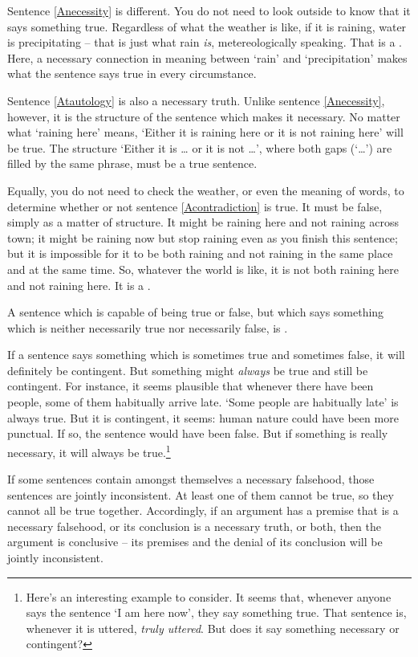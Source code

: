 Sentence \ref{Anecessity} is different. You do not need to look outside to know that it says something true. Regardless of what the weather is like, if it is raining, water is precipitating – that is just what rain \emph{is}, metereologically speaking. That is a . Here, a necessary connection in meaning between `rain' and `precipitation' makes what the sentence says true in every circumstance.

Sentence \ref{Atautology} is also a necessary truth. Unlike sentence \ref{Anecessity}, however, it is the structure of the sentence which makes it necessary. No matter what `raining here' means, `Either it is raining here or it is not raining here' will be true. The structure `\textsf{Either it is} … \textsf{or it is not} …', where both gaps (`…') are filled by the same phrase, must be a true sentence.

Equally, you do not need to check the weather, or even the meaning of words, to determine whether or not sentence \ref{Acontradiction} is true. It must be false, simply as a matter of structure. It might be raining here and not raining across town; it might be raining now but stop raining even as you finish this sentence; but it is impossible for it to be both raining and not raining in the same place and at the same time. So, whatever the world is like, it is not both raining here and not raining here. It is a .

A sentence which is capable of being true or false, but which says something which is neither necessarily true nor necessarily false, is .

If a sentence says something which is sometimes true and sometimes false, it will definitely be contingent. But something might \emph{always} be true and still be contingent. For instance, it seems plausible that whenever there have been people, some of them habitually arrive late. `Some people are habitually late' is always true. But it is contingent, it seems: human nature could have been more punctual. If so, the sentence would have been false. But if something is really necessary, it will always be true.\footnote{Here's an interesting example to consider. It seems that, whenever anyone says the sentence `I am here now', they say something true. That sentence is, whenever it is uttered, \emph{truly uttered}. But does it say something necessary or contingent?}


If some sentences contain amongst themselves a necessary falsehood, those sentences are jointly inconsistent. At least one of them cannot be true, so they cannot all be true together. Accordingly, if an argument has a premise that is a necessary falsehood, or its conclusion is a necessary truth, or both, then the argument is conclusive – its premises and the denial of its conclusion will be jointly inconsistent. 

